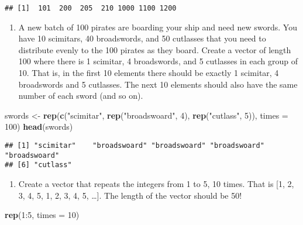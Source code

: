 \documentclass[]{book}
\newenvironment{Shaded}{\begin{snugshade}}{\end{snugshade}}
\newcommand{\KeywordTok}[1]{\textcolor[rgb]{0.13,0.29,0.53}{\textbf{{#1}}}}
\newcommand{\DataTypeTok}[1]{\textcolor[rgb]{0.13,0.29,0.53}{{#1}}}
\newcommand{\DecValTok}[1]{\textcolor[rgb]{0.00,0.00,0.81}{{#1}}}
\newcommand{\StringTok}[1]{\textcolor[rgb]{0.31,0.60,0.02}{{#1}}}
\newcommand{\NormalTok}[1]{{#1}}
\providecommand{\tightlist}{%
  \setlength{\itemsep}{0pt}\setlength{\parskip}{0pt}}
\begin{document}
\begin{verbatim}
## [1]  101  200  205  210 1000 1100 1200
\end{verbatim}

\begin{enumerate}
\def\labelenumi{\arabic{enumi}.}
\setcounter{enumi}{4}
\tightlist
\item
  A new batch of 100 pirates are boarding your ship and need new swords.
  You have 10 scimitars, 40 broadswords, and 50 cutlasses that you need
  to distribute evenly to the 100 pirates as they board. Create a vector
  of length 100 where there is 1 scimitar, 4 broadswords, and 5
  cutlasses in each group of 10. That is, in the first 10 elements there
  should be exactly 1 scimitar, 4 broadswords and 5 cutlasses. The next
  10 elements should also have the same number of each sword (and so
  on).
\end{enumerate}

\begin{Shaded}
\begin{Highlighting}[]
\NormalTok{swords <-}\StringTok{ }\KeywordTok{rep}\NormalTok{(}\KeywordTok{c}\NormalTok{(}\StringTok{"scimitar"}\NormalTok{, }\KeywordTok{rep}\NormalTok{(}\StringTok{"broadswoard"}\NormalTok{, }\DecValTok{4}\NormalTok{), }\KeywordTok{rep}\NormalTok{(}\StringTok{"cutlass"}\NormalTok{, }\DecValTok{5}\NormalTok{)), }\DataTypeTok{times =} \DecValTok{100}\NormalTok{)}
\KeywordTok{head}\NormalTok{(swords)}
\end{Highlighting}
\end{Shaded}

\begin{verbatim}
## [1] "scimitar"    "broadswoard" "broadswoard" "broadswoard" "broadswoard"
## [6] "cutlass"
\end{verbatim}

\begin{enumerate}
\def\labelenumi{\arabic{enumi}.}
\setcounter{enumi}{5}
\tightlist
\item
  Create a vector that repeats the integers from 1 to 5, 10 times. That
  is {[}1, 2, 3, 4, 5, 1, 2, 3, 4, 5, \ldots{}{]}. The length of the
  vector should be 50!
\end{enumerate}

\begin{Shaded}
\begin{Highlighting}[]
\KeywordTok{rep}\NormalTok{(}\DecValTok{1}\NormalTok{:}\DecValTok{5}\NormalTok{, }\DataTypeTok{times =} \DecValTok{10}\NormalTok{)}
\end{Highlighting}
\end{Shaded}
\end{document}
